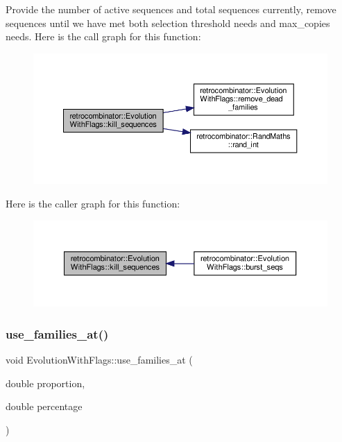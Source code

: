 Provide the number of active sequences and total sequences currently, remove sequences until we have met both selection threshold needs and max\+\_\+copies needs. Here is the call graph for this function\+:
\nopagebreak
\begin{figure}[H]
\begin{center}
\leavevmode
\includegraphics[width=350pt]{classretrocombinator_1_1EvolutionWithFlags_ae5a9e278233d2ea42bdef4df66d4b5b9_cgraph}
\end{center}
\end{figure}
Here is the caller graph for this function\+:
\nopagebreak
\begin{figure}[H]
\begin{center}
\leavevmode
\includegraphics[width=350pt]{classretrocombinator_1_1EvolutionWithFlags_ae5a9e278233d2ea42bdef4df66d4b5b9_icgraph}
\end{center}
\end{figure}
\mbox{\label{classretrocombinator_1_1EvolutionWithFlags_ad94cabcb6a894d503c3d84c6022a1438}} 
\subsubsection{\texorpdfstring{use\+\_\+families\+\_\+at()}{use\_families\_at()}}
{\footnotesize\ttfamily void Evolution\+With\+Flags\+::use\+\_\+families\+\_\+at (\begin{DoxyParamCaption}\item[{double}]{proportion,  }\item[{double}]{percentage }\end{DoxyParamCaption})}



